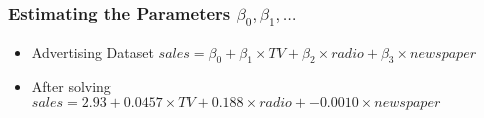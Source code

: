 



\begin{frame}[fragile]\frametitle{Estimating the Parameters $\beta_0,\beta_1,\ldots$}
\begin{itemize}
\item Advertising Dataset
$ sales = \beta_0 + \beta_1 \times TV + \beta_2 \times radio + \beta_3 \times newspaper$
\item After solving
$ sales = 2.93 + 0.0457 \times TV + 0.188 \times radio + -0.0010 \times newspaper$
\end{itemize}
\end{frame}

